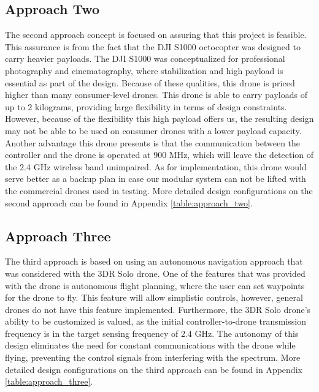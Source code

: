 \subsection{Approach Two}
The second approach concept is focused on assuring that this project is feasible. This assurance is from the fact that the DJI S1000 octocopter was designed to carry heavier payloads. The DJI S1000 was conceptualized for professional photography and cinematography, where stabilization and high payload is essential as part of the design. Because of these qualities, this drone is priced higher than many consumer-level drones. This drone is able to carry payloads of up to 2 kilograms, providing large flexibility in terms of design constraints. However, because of the flexibility this high payload offers us, the resulting design may not be able to be used on consumer drones with a lower payload capacity. Another advantage this drone presents is that the communication between the controller and the drone is operated at 900 MHz, which will leave the detection of the 2.4 GHz wireless band unimpaired. As for implementation, this drone would serve better as a backup plan in case our modular system can not be lifted with the commercial drones used in testing. More detailed design configurations on the second approach can be found in Appendix \ref{table:approach_two}.

\subsection{Approach Three}
The third approach is based on using an autonomous navigation approach that was considered with the 3DR Solo drone. One of the features that was provided with the drone is autonomous flight planning, where the user can set waypoints for the drone to fly. This feature will allow simplistic controls, however, general drones do not have this feature implemented. Furthermore, the 3DR Solo drone’s ability to be customized is valued, as the initial controller-to-drone transmission frequency is in the target sensing frequency of 2.4 GHz. The autonomy of this design eliminates the need for constant communications with the drone while flying, preventing the control signals from interfering with the spectrum. More detailed design configurations on the third approach can be found in Appendix \ref{table:approach_three}.

